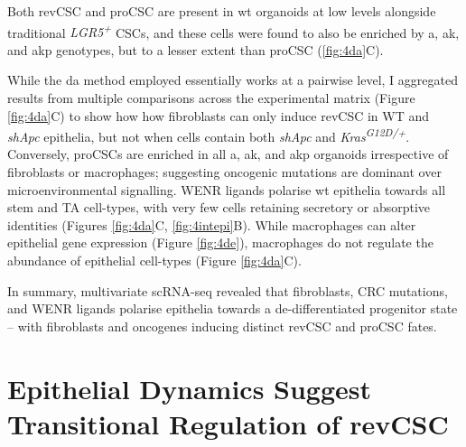 Both revCSC and proCSC are present in \acrshort{wt} organoids at low levels alongside traditional \textit{LGR5\textsuperscript{+}} CSCs, and these cells were found to also be enriched by \acrshort{a}, \acrshort{ak}, and \acrshort{akp} genotypes, but to a lesser extent than proCSC (\ref{fig:4da}C).

While the \acrshort{da} method employed essentially works at a pairwise level, I aggregated results from multiple comparisons across the experimental matrix (Figure \ref{fig:4da}C) to show how how fibroblasts can only induce revCSC in WT and \textit{shApc} epithelia, but not when cells contain both \textit{shApc} and \textit{Kras\textsuperscript{G12D/+}}. Conversely, proCSCs are enriched in all \acrshort{a}, \acrshort{ak}, and \acrshort{akp} organoids irrespective of fibroblasts or macrophages; suggesting oncogenic mutations are dominant over microenvironmental signalling. WENR ligands polarise \acrshort{wt} epithelia towards all stem and TA cell-types, with very few cells retaining secretory or absorptive identities (Figures \ref{fig:4da}C, \ref{fig:4intepi}B). While macrophages can alter epithelial gene expression (Figure \ref{fig:4de}), macrophages do not regulate the abundance of epithelial cell-types (Figure \ref{fig:4da}C). 

In summary, multivariate scRNA-seq revealed that fibroblasts, CRC mutations, and WENR ligands polarise epithelia towards a de-differentiated progenitor state – with fibroblasts and oncogenes inducing distinct revCSC and proCSC fates.

\newpage
\section{Epithelial Dynamics Suggest Transitional Regulation of revCSC}

